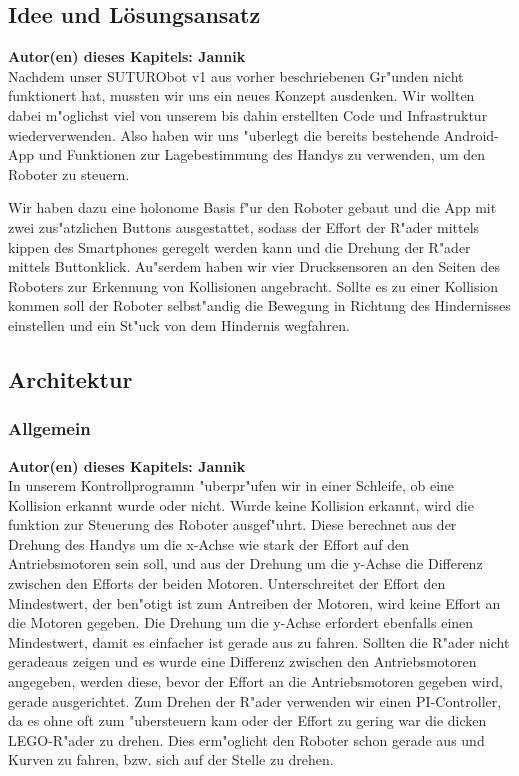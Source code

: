 \documentclass[8pt]{article}
\newcommand{\secauthor}[1]{\textbf{Autor(en) dieses Kapitels: {#1}}\\}
\begin{document}
\subsection{Idee und Lösungsansatz} 
\secauthor{Jannik}
Nachdem unser SUTURObot v1 aus vorher beschriebenen Gr"unden nicht funktionert hat, mussten wir uns ein neues Konzept ausdenken. Wir wollten dabei m"oglichst viel von unserem bis dahin erstellten Code und Infrastruktur wiederverwenden. Also haben wir uns "uberlegt die bereits bestehende Android-App und Funktionen zur Lagebestimmung des Handys zu verwenden, um den Roboter zu steuern.

Wir haben dazu eine holonome Basis f"ur den Roboter gebaut und die App mit zwei zus"atzlichen Buttons ausgestattet, sodass der Effort der R"ader mittels kippen des Smartphones geregelt werden kann und die Drehung der R"ader mittels Buttonklick. Au"serdem haben wir vier Drucksensoren an den Seiten des Roboters zur Erkennung von Kollisionen angebracht. Sollte es zu einer Kollision kommen soll der Roboter selbst"andig die Bewegung in Richtung des Hindernisses einstellen und ein St"uck von dem Hindernis wegfahren.

\subsection{Architektur}

\subsubsection{Allgemein}
\secauthor{Jannik}
In unserem Kontrollprogramm "uberpr"ufen wir in einer Schleife, ob eine Kollision erkannt wurde oder nicht. Wurde keine Kollision erkannt, wird die funktion zur Steuerung des Roboter ausgef"uhrt. Diese berechnet aus der Drehung des Handys um die x-Achse wie stark der Effort auf den Antriebsmotoren sein soll, und aus der Drehung um die y-Achse die Differenz zwischen den Efforts der beiden Motoren. Unterschreitet der Effort den Mindestwert, der ben"otigt ist zum Antreiben der Motoren, wird keine Effort an die Motoren gegeben. Die Drehung um die y-Achse erfordert ebenfalls einen Mindestwert, damit es einfacher ist gerade aus zu fahren. Sollten die R"ader nicht geradeaus zeigen und es wurde eine Differenz zwischen den Antriebsmotoren angegeben, werden diese, bevor der Effort an die Antriebsmotoren gegeben wird, gerade ausgerichtet. Zum Drehen der R"ader verwenden wir einen PI-Controller, da es ohne oft zum "ubersteuern kam oder der Effort zu gering war die dicken LEGO-R"ader zu drehen. Dies erm"oglicht den Roboter schon gerade aus und Kurven zu fahren, bzw. sich auf der Stelle zu drehen.
\end{document}
